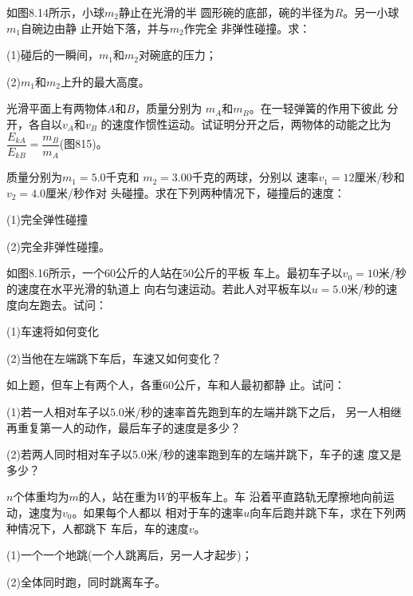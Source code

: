 \begin{exercises}
\exercise 如图8.14所示，小球$ m _ { 2 } $静止在光滑的半
圆形碗的底部，碗的半径为$ R $。另一小球$ m _  { 1 } $自碗边由静
止开始下落，并与$ m _ { 2 } $作完全
非弹性碰撞。求：

(1)碰后的一瞬间，$ m _ { 1 } $和$ m _ { 2 } $对碗底的压力；

(2)\;$ m _ { 1 } $和$ m _ { 2 } $上升的最大高度。

\exercise 光滑平面上有两物体$ A $和$ B $，质量分别为
$ m _ { A } $和$ m _ { B } $。在一轻弹簧的作用下彼此
分开，各自以$ v _ { A } $和$ v _ { B } $
的速度作惯性运动。试证明分开之后，两物体的动能之比为
$ \dfrac { E _ { k A } } { E _ { k B } } = \dfrac { m _ { B } } { m _ { A } } $(图815)。

\exercise 质量分别为$ m _ { 1 } = 5.0 $千克和
$ m _ { 2 } = 3.00 $千克的两球，分别以
速率$ v _ { 1 } = 12 $厘米/秒和$ v _ { 2 } = 4.0 $厘米/秒作对
头碰撞。求在下列两种情况下，碰撞后的速度：

(1)完全弹性碰撞

(2)完全非弹性碰撞。

\exercise 如图8.16所示，一个$ 60 $公斤的人站在$ 50 $公斤的平板
车上。最初车子以$ v _ { 0 } = 10 $米/秒的速度在水平光滑的轨道上
向右匀速运动。若此人对平板车以$ u=5.0 $米/秒的速度向左跑去。试问：

(1)车速将如何变化

(2)当他在左端跳下车后，车速又如何变化？

\exercise 如上题，但车上有两个人，各重$ 60 $公斤，车和人最初都静
止。试问：

(1)若一人相对车子以$ 5.0 $米/秒的速率首先跑到车的左端并跳下之后，
另一人相继再重复第一人的动作，最后车子的速度是多少？

(2)若两人同时相对车子以5.0米/秒的速率跑到车的左端并跳下，车子的速
度又是多少？

\exercise \;$ n $个体重均为$ m $的人，站在重为$ W $的平板车上。车
沿着平直路轨无摩擦地向前运动，速度为$ v _ { 0 } $。如果每个人都以
相对于车的速率$ u $向车后跑并跳下车，求在下列两种情况下，人都跳下
车后，车的速度$ v $。

(1)一个一个地跳(一个人跳离后，另一人才起步)；

(2)全体同时跑，同时跳离车子。


\end{exercises}
